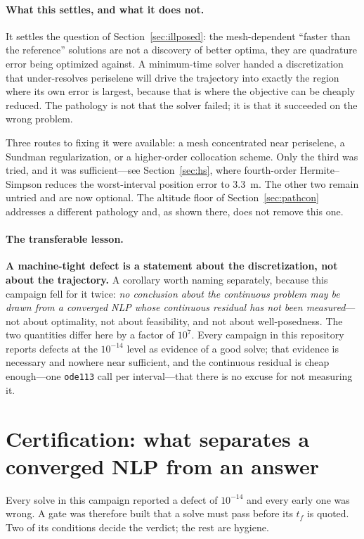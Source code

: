 \documentclass[11pt]{article}
\newcommand{\code}[1]{\texttt{#1}}
\begin{document}
\paragraph{What this settles, and what it does not.} It settles the question of
Section~\ref{sec:illposed}: the mesh-dependent ``faster than the reference''
solutions are not a discovery of better optima, they are quadrature error being
optimized against. A minimum-time solver handed a discretization that
under-resolves periselene will drive the trajectory into exactly the region
where its own error is largest, because that is where the objective can be
cheaply reduced. The pathology is not that the solver failed; it is that it
succeeded on the wrong problem.

Three routes to fixing it were available: a mesh concentrated near periselene, a
Sundman regularization, or a higher-order collocation scheme. Only the third was
tried, and it was sufficient---see Section~\ref{sec:hs}, where fourth-order
Hermite--Simpson reduces the worst-interval position error to $3.3$~m. The other
two remain untried and are now optional. The altitude floor of
Section~\ref{sec:pathcon} addresses a different pathology and, as shown there,
does not remove this one.

\paragraph{The transferable lesson.} \textbf{A machine-tight defect is a
statement about the discretization, not about the trajectory.}
A corollary worth naming separately, because this campaign fell for it twice:
\emph{no conclusion about the continuous problem may be drawn from a converged
NLP whose continuous residual has not been measured}---not about optimality, not
about feasibility, and not about well-posedness. The two
quantities differ here by a factor of $10^7$. Every campaign in this repository
reports defects at the $10^{-14}$ level as evidence of a good solve; that
evidence is necessary and nowhere near sufficient, and the continuous residual
is cheap enough---one \code{ode113} call per interval---that there is no excuse
for not measuring it.

\section{Certification: what separates a converged NLP from an answer}
\label{sec:gate}

Every solve in this campaign reported a defect of $10^{-14}$ and every early one
was wrong. A gate was therefore built that a solve must pass before its $t_f$ is
quoted. Two of its conditions decide the verdict; the rest are hygiene.
\end{document}
